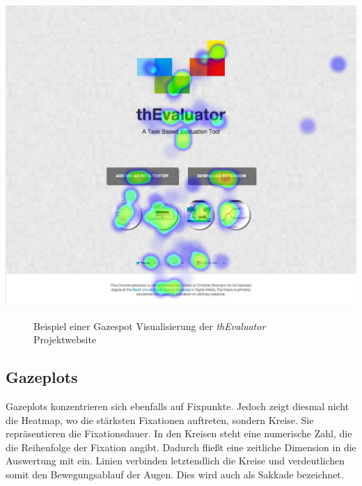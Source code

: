 \vspace{0.3cm}
\begin{center}
\includegraphics[scale=0.35]{./images/gazespot}
\end{center}
\begin{figure}[htb]
   \centering
   \caption{Beispiel einer Gazespot Visualisierung der \textit{thEvaluator} Projektwebsite}
    \label{gazespot}
\end{figure}


\subsection{Gazeplots}

Gazeplots konzentrieren sich ebenfalls auf Fixpunkte. Jedoch zeigt diesmal nicht die Heatmap, wo die stärksten \Gls{Fixationen} auftreten, sondern Kreise. Sie repräsentieren die Fixationsdauer. In den Kreisen steht eine numerische Zahl, die die Reihenfolge der Fixation angibt. Dadurch fließt eine zeitliche Dimension in die Auswertung mit ein. Linien verbinden letztendlich die Kreise und verdeutlichen somit den Bewegungsablauf der Augen. Dies wird auch als Sakkade bezeichnet.

